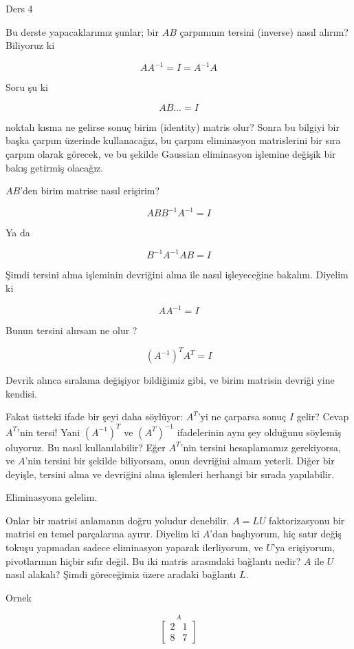 \documentclass[12pt,fleqn]{article}\usepackage{../../common}
\begin{document}
Ders 4

Bu derste yapacaklarımız şunlar; bir $AB$ çarpımının tersini (inverse)
nasıl alırım? Biliyoruz ki 

$$ AA ^{-1}  = I = A ^{-1} A $$

Soru şu ki 

$$ AB... = I $$

noktalı kısma ne gelirse sonuç birim (identity) matris olur? Sonra bu
bilgiyi bir başka çarpım üzerinde kullanacağız, bu çarpım eliminasyon
matrislerini bir sıra çarpım olarak görecek, ve bu şekilde Gaussian
eliminasyon işlemine değişik bir bakış getirmiş olacağız. 

$AB$'den birim matrise nasıl erişirim? 

$$ ABB ^{-1} A ^{-1} = I $$

Ya da

$$ B ^{-1}A ^{-1} AB  = I$$

Şimdi tersini alma işleminin devriğini alma ile nasıl işleyeceğine
bakalım. Diyelim ki 

$$ AA ^{-1} = I $$

Bunun tersini alırsam ne olur ?

$$ (A ^{-1})^T A^T = I $$

Devrik alınca sıralama değişiyor bildiğimiz gibi, ve birim matrisin devriği
yine kendisi. 

Fakat üstteki ifade bir şeyi daha söylüyor: $A^T$'yi ne çarparsa sonuç $I$
gelir? Cevap $A^T$'nin tersi! Yani $(A ^{-1})^T$ ve  $(A^T) ^{-1}$
ifadelerinin aynı şey olduğunu söylemiş oluyoruz. Bu nasıl kullanılabilir?
Eğer $A^T$'nin tersini hesaplamamız gerekiyorsa, ve $A$'nin tersini bir
şekilde biliyorsam, onun devriğini almam yeterli. Diğer bir deyişle,
tersini alma ve devriğini alma işlemleri herhangi bir sırada yapılabilir. 

Eliminasyona gelelim.

Onlar bir matrisi anlamanın doğru yoludur denebilir. $A = LU$
faktorizasyonu bir matrisi en temel parçalarına ayırır. Diyelim ki $A$'dan
başlıyorum, hiç satır değiş tokuşu yapmadan sadece eliminasyon yaparak
ilerliyorum, ve $U$'ya erişiyorum, pivotlarımın hiçbir sıfır değil. Bu iki
matris arasındaki bağlantı nedir? $A$ ile $U$ nasıl alakalı? Şimdi
göreceğimiz üzere aradaki bağlantı $L$. 

Ornek

$$ \stackrel{A}{
\left[\begin{array}{rr}
2 & 1 \\ 8 & 7
\end{array}\right]
}
 $$
\end{document}
